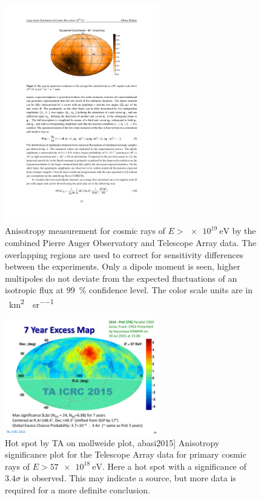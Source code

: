\begin{figure}
    \centering
    \includegraphics[width=0.6\textwidth]
                    {plots/cosmic-rays/skymap_ta_auger}
    \caption{Anisotropy measurement for cosmic rays of $E > \SI{e19}{\eV}$ by the combined Pierre Auger Observatory and Telescope Array data. The overlapping regions are used to correct for sensitivity differences between the experiments. Only a dipole moment is seen, higher multipoles do not deviate from the expected fluctuations of an isotropic flux at \SI{99}{\percent} confidence level. The color scale units are in \si{\per\kilo\meter\squared\per\year\per\steradian}}
    \label{fig:skymap_ta_auger}
\end{figure}

\begin{figure}
    \centering
    \includegraphics[width=0.6\textwidth]
                    {plots/cosmic-rays/hotspot_ta}
    \caption{Hot spot by TA on mollweide plot, abasi2015]
Anisotropy significance plot for the Telescope Array data for primary cosmic rays of $E > \SI{57e18}{\eV}$. Here a hot spot with a significance of $3.4 \sigma$ is observed. This may indicate a source, but more data is required for a more definite conclusion.}
    \label{fig:hotspot_ta}
\end{figure}

